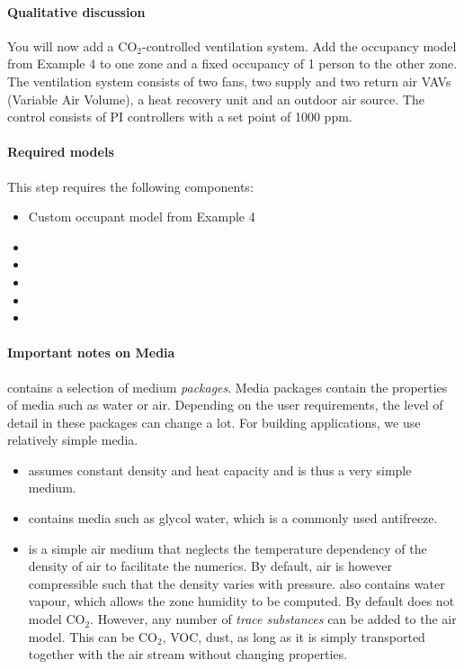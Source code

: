 \documentclass[10pt,a4paper]{article}
\begin{document}
\paragraph{Qualitative discussion}
You will now add a CO$_2$-controlled ventilation system.
Add the occupancy model from Example 4 to one zone
and a fixed occupancy of 1 person to the other zone.
The ventilation system consists of two fans, two supply and two return air
VAVs (Variable Air Volume), a heat recovery unit and an outdoor air source.
The control consists of PI controllers with a set point of 1000 ppm.

\paragraph{Required models}
This step requires the following components:
\begin{itemize}
\item Custom occupant model from Example 4
\item {}
\item {}
\item {}
\item {}
\item {}
\end{itemize}

\paragraph{Important notes on Media}
 contains a selection of medium \textit{packages}. 
Media packages contain the properties of media such as water or air.
Depending on the user requirements, the level of detail in these packages can change a lot.
For building applications, we use relatively simple media.
\begin{itemize}
	\item {} assumes constant density and heat capacity and is thus
	a very simple medium.
	\item {} contains media such as glycol water,
	which is a commonly used antifreeze.
	\item {} is a simple air medium that 
	neglects the temperature dependency of the density of air to
	facilitate the numerics. By default, air is however compressible such that the density
	varies with pressure.
	 also contains water vapour,
	which allows the zone humidity to be computed. By default  does not model CO$_2$.
	However, any number of \textit{trace substances} can be added to the air model.
	This can be CO$_2$, VOC, dust, as long as it is simply transported together
	with the air stream without changing properties.
\end{itemize}
\end{document}
